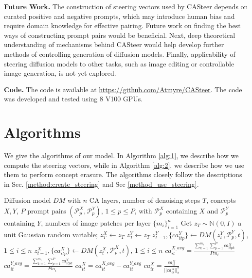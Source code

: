 \textbf{Future Work. } The construction of steering vectors used by CASteer depends on curated positive and negative prompts, which may introduce human bias and require domain knowledge for effective pairing. Future work on finding the best ways of constructing prompt pairs would be beneficial. Next, deep theoretical understanding of mechanisms behind CASteer would help develop further methods of controlling generation of diffusion models. Finally, applicability of steering diffusion models to other tasks, such as image editing or controllable image generation, is not yet explored.

\textbf{Code. } The code is available at \href{https://github.com/Atmyre/CASteer}{https://github.com/Atmyre/CASteer}. The code was developed and tested using 8 V100 GPUs.


\clearpage
\section{Algorithms} 

We give the algorithms of our model.
%
In Algorithm \ref{alg:1}, we describe how we compute the steering vectors, while in Algorithm \ref{alg:2}, we describe how we use them to perform concept erasure.
%
The algorithms closely follow the descriptions in Sec. \ref{method:create_steering} and Sec \ref{method_use_steering}.

\begin{algorithm}[h!]
\caption{Computing steering vectors}\label{alg:cap}
\begin{algorithmic}
\Require Diffusion model $DM$ with $n$ CA layers, number of denoising steps $T$, concepts $X, Y$, $P$ prompt pairs $(\mathcal{P}^{X}_p, \mathcal{P}^{Y}_p)$, $1 \leqslant p \leqslant P$, with $\mathcal{P}^{X}_p$ containing $X$ and $\mathcal{P}^{Y}_p$ containing $Y$, numbers of image patches per layer $\{m_i\}_{i=1}^n$
\State Get $z_T \sim \mathbb{N}(0,I)$ a unit Gaussian random variable;
\State $z_T^{X}  \leftarrow z_T$
\State $z_T^{Y}  \leftarrow z_T$
        \State $z^{Y}_{t-1}, \{ca^{Y}_{itp}\} \leftarrow DM(z^{Y}_t, \mathcal{P}^{Y}_p, t)$, $1 \leqslant i \leqslant n$
        \State $z^{X}_{t-1}, \{ca^{X}_{itp}\} \leftarrow DM(z^{X}_t, \mathcal{P}^{X}_p, t)$, $1 \leqslant i \leqslant n$
    \EndFor
\EndFor
\State $ca^{X\_avg}_{it} = \frac{\sum_{k=1}^{m_i} \sum_{p=1}^P ca^{X}_{itpk}}{Pm_i}$
\State $ca^{Y\_avg}_{it} = \frac{\sum_{k=1}^{m_i} \sum_{p=1}^P ca^{Y}_{itpk}}{Pm_i}$
\State $ca^{X}_{it} = ca^{X\_avg}_{it} - ca^{Y\_avg}_{it}$
\State $ca^{X}_{it} = \frac{ca^{X}_{it}}{||ca^{X}_{it}||^2_2}$ 
\end{algorithmic}
\label{alg:1}
\end{algorithm}

